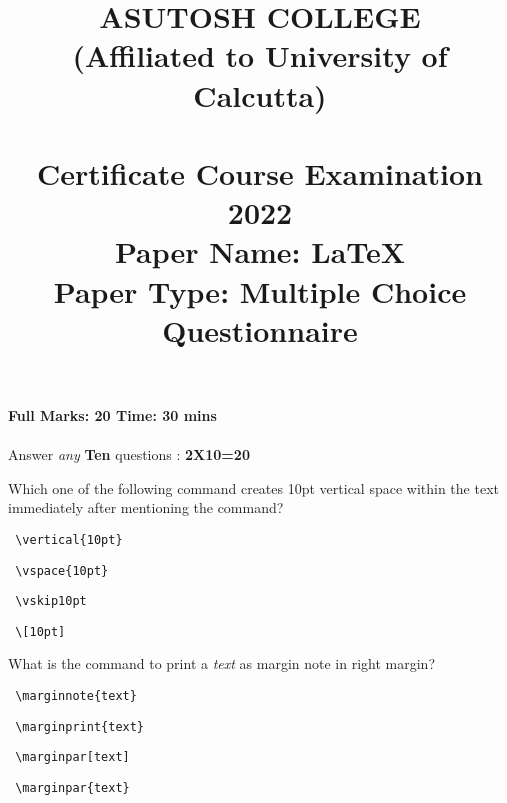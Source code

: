 \documentclass{exam}
\title{{\bf ASUTOSH COLLEGE} \\
	{\large \bf (Affiliated to University of Calcutta)} \\ \ \\
	{\LARGE \bf Certificate Course Examination 2022} \\
    {Paper Name: {\bf \LaTeX}} \\
    {Paper Type: {Multiple Choice Questionnaire}}
    }
\author{}
\date{}
\begin{document}
\maketitle
	
\textbf{\Large Full Marks: 20 \hfill Time: 30 mins} \\ \ \\
{\Large Answer {\it any} {\bf Ten} questions : \hfill {\bf 2X10=20}} \\
	
\begin{questions}
		
\question \Large Which one of the following command creates 10pt vertical space within the text immediately after mentioning the command? %
\begin{multicols}{2}
\begin{choices}
	  \choice \begin{verbatim} \vertical{10pt} \end{verbatim}
	  \choice \begin{verbatim} \vspace{10pt} \end{verbatim}
	  \choice \begin{verbatim} \vskip10pt \end{verbatim}
	  \choice \begin{verbatim} \[10pt] \end{verbatim}
\end{choices}
\end{multicols}

\question What is the command to print a {\it text} as margin note in right margin? %
\begin{multicols}{2}
	\begin{choices}
		\choice \begin{verbatim} \marginnote{text} \end{verbatim}
		\choice \begin{verbatim} \marginprint{text} \end{verbatim}
		\choice \begin{verbatim} \marginpar[text] \end{verbatim}
		\choice \begin{verbatim} \marginpar{text} \end{verbatim}
	\end{choices}
\end{multicols}


\end{questions}
\end{document}
